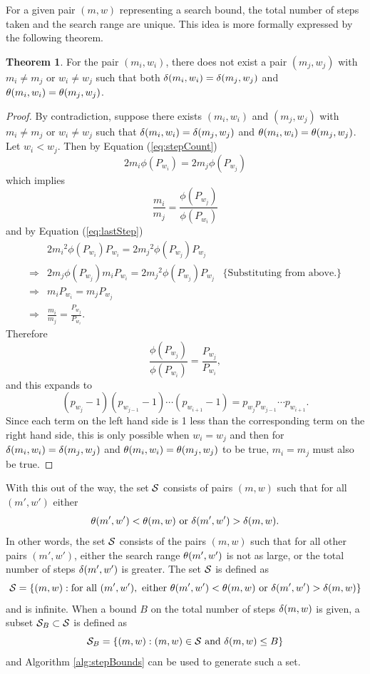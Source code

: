 \documentclass{ucalgthes1}
\theoremstyle{definition}
\newtheorem{thm}{Theorem}[section]
\begin{document}
For a given pair $(m, w)$ representing a search bound, the total number of steps taken and the search range are unique.  This idea is more formally expressed by the following theorem.
\begin{thm}
For the pair $(m_i, w_i)$, there does not exist a pair $(m_j, w_j)$ with $m_i \neq m_j$ or $w_i \neq w_j$ such that both $\delta(m_i, w_i) = \delta(m_j, w_j)$ and $\theta(m_i, w_i) = \theta(m_j, w_j)$.
\end{thm}
\begin{proof}
By contradiction, suppose there exists $(m_i, w_i)$ and $(m_j, w_j)$ with $m_i \neq m_j$ or $w_i \neq w_j$ such that $\delta(m_i, w_i) = \delta(m_j, w_j)$ and $\theta(m_i, w_i) = \theta(m_j, w_j)$.  Let $w_i < w_j$. Then by Equation (\ref{eq:stepCount})
\[
	2m_i\phi(P_{w_i}) = 2m_j\phi(P_{w_j})
\]
which implies
\[
	\frac{m_i}{m_j} = \frac{\phi(P_{w_j})}{\phi(P_{w_i})}
\]
and by Equation (\ref{eq:lastStep})
\begin{align*}
	& 2{m_i}^2\phi(P_{w_i})P_{w_i} = 2{m_j}^2\phi(P_{w_j})P_{w_j} \\
\Rightarrow & 2m_j\phi(P_{w_j})m_i P_{w_i} = 2{m_j}^2\phi(P_{w_j})P_{w_j} & \textrm{\{Substituting from above.\}} \\
\Rightarrow & m_iP_{w_i} = m_jP_{w_j} \\
\Rightarrow & \frac{m_i}{m_j} = \frac{P_{w_j}}{P_{w_i}}.
\end{align*}
Therefore
\[
	\frac{\phi(P_{w_j})}{\phi(P_{w_i})} = \frac{P_{w_j}}{P_{w_i}},
\]
and this expands to
\[
	(p_{w_j} - 1)(p_{w_{j-1}} - 1) \cdots (p_{w_{i+1}} - 1) = p_{w_j} p_{w_{j-1}} \cdots p_{w_{i+1}}.
\]
Since each term on the left hand side is 1 less than the corresponding term on the right hand side, this is only possible when $w_i = w_j$ and then for $\delta(m_i, w_i) = \delta(m_j, w_j)$ and $\theta(m_i, w_i) = \theta(m_j, w_j)$ to be true, $m_i = m_j$ must also be true.
\end{proof}

With this out of the way, the set $\mathcal S$ consists of pairs $(m, w)$ such that for all $(m', w')$ either
\[
	\theta(m', w') < \theta(m, w) \textrm{ or } \delta(m', w') > \delta(m, w).
\]
In other words, the set $\mathcal S$ consists of the pairs $(m, w)$ such that for all other pairs $(m', w')$, either the search range $\theta(m', w')$ is not as large, or the total number of steps $\delta(m', w')$ is greater.  The set $\mathcal S$ is defined as
\begin{equation}
\label{eq:stepBounds}
  \mathcal S = \left\{ (m, w) : \textrm{for all } (m', w'), \textrm{ either }  \theta(m', w') < \theta(m, w) \textrm{ or } \delta(m', w') > \delta(m, w) \right\}
\end{equation}
and is infinite.  When a bound $B$ on the total number of steps $\delta(m, w)$ is given, a subset $\mathcal S_B \subset \mathcal S$ is defined as
\begin{equation}
\label{eq:stepBoundsB}
   \mathcal S_B = \left\{ (m, w) : (m, w) \in \mathcal S \textrm{ and } \delta(m, w) \le B \right\}
\end{equation}
and Algorithm \ref{alg:stepBounds} can be used to generate such a set.
\end{document}
